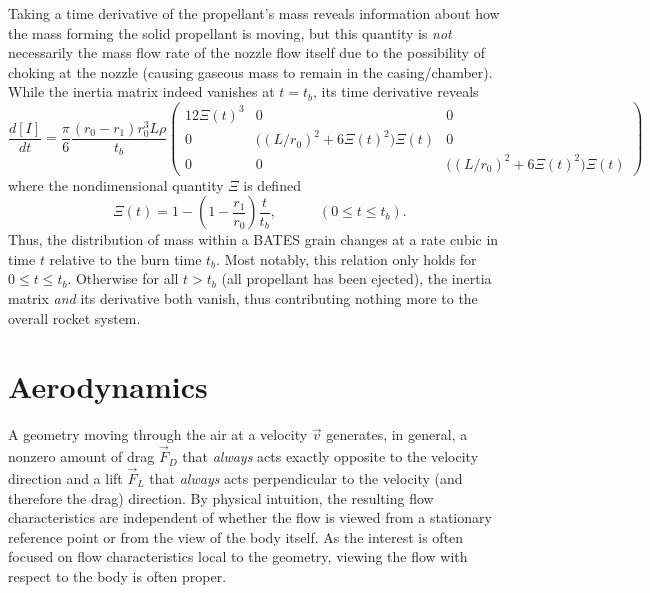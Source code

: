\documentclass[11pt,dvipsnames]{thesis}
\begin{document}
Taking a time derivative of the propellant's mass reveals information about how the mass forming the solid propellant is moving, but this quantity is \textit{not} necessarily the mass flow rate of the nozzle flow itself due to the possibility of choking at the nozzle (causing gaseous mass to remain in the casing/chamber). While the inertia matrix indeed vanishes at $t = t_b$, its time derivative reveals
\begin{equation}
\frac{d[I]}{dt} = \frac{\pi}{6}\frac{(r_0 - r_1)r_0^3 L \rho}{t_b}\begin{pmatrix}12\Xi(t)^3 & 0 & 0 \\ 0 & \big((L / r_0)^2 + 6\Xi(t)^2\big)\Xi(t) & 0 \\ 0 & 0 & \big((L / r_0)^2 + 6\Xi(t)^2\big)\Xi(t) \end{pmatrix}
\end{equation}
where the nondimensional quantity $\Xi$ is defined
\begin{equation}
\Xi(t) = 1 - \left(1 - \frac{r_1}{r_0}\right) \frac{t}{t_b}, \qquad\quad (0 \leqslant t \leqslant t_b).
\end{equation}
Thus, the distribution of mass within a BATES grain changes at a rate cubic in time $t$ relative to the burn time $t_b$. Most notably, this relation only holds for $0 \leqslant t \leqslant t_b$. Otherwise for all $t > t_b$ (all propellant has been ejected), the inertia matrix \textit{and} its derivative both vanish, thus contributing nothing more to the overall rocket system.


\chapter{Aerodynamics}

A geometry moving through the air at a velocity $\vec{v}$ generates, in general, a nonzero amount of drag $\vec{F}_D$ that \textit{always} acts exactly opposite to the velocity direction and a lift $\vec{F}_L$ that \textit{always} acts perpendicular to the velocity (and therefore the drag) direction. By physical intuition, the resulting flow characteristics are independent of whether the flow is viewed from a stationary reference point or from the view of the body itself. As the interest is often focused on flow characteristics local to the geometry, viewing the flow with respect to the body is often proper.
\end{document}
